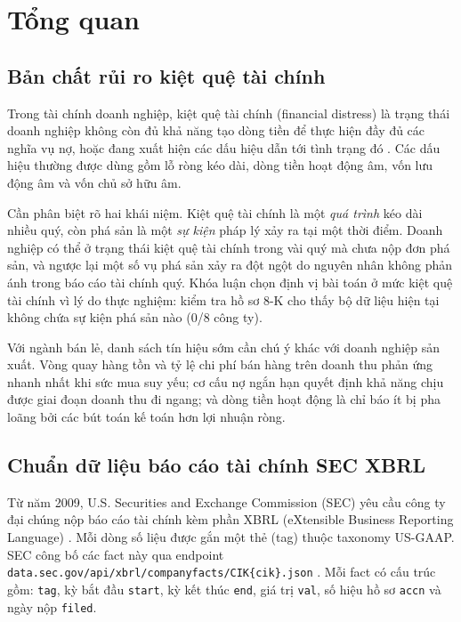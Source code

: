\chapter{Tổng quan}

\section{Bản chất rủi ro kiệt quệ tài chính}

Trong tài chính doanh nghiệp, kiệt quệ tài chính (financial distress) là trạng thái doanh nghiệp
không còn đủ khả năng tạo dòng tiền để thực hiện đầy đủ các nghĩa vụ nợ, hoặc đang xuất hiện các
dấu hiệu dẫn tới tình trạng đó \cite{beaver1966}. Các dấu hiệu thường được dùng gồm lỗ ròng kéo dài,
dòng tiền hoạt động âm, vốn lưu động âm và vốn chủ sở hữu âm.

Cần phân biệt rõ hai khái niệm. Kiệt quệ tài chính là một \emph{quá trình} kéo dài nhiều quý, còn
phá sản là một \emph{sự kiện} pháp lý xảy ra tại một thời điểm. Doanh nghiệp có thể ở trạng thái
kiệt quệ tài chính trong vài quý mà chưa nộp đơn phá sản, và ngược lại một số vụ phá sản xảy ra
đột ngột do nguyên nhân không phản ánh trong báo cáo tài chính quý. Khóa luận chọn định vị bài toán
ở mức kiệt quệ tài chính vì lý do thực nghiệm: kiểm tra hồ sơ 8-K cho thấy bộ dữ liệu hiện tại
không chứa sự kiện phá sản nào (0/8 công ty).

Với ngành bán lẻ, danh sách tín hiệu sớm cần chú ý khác với doanh nghiệp sản xuất. Vòng quay hàng
tồn và tỷ lệ chi phí bán hàng trên doanh thu phản ứng nhanh nhất khi sức mua suy yếu; cơ cấu nợ
ngắn hạn quyết định khả năng chịu được giai đoạn doanh thu đi ngang; và dòng tiền hoạt động là chỉ
báo ít bị pha loãng bởi các bút toán kế toán hơn lợi nhuận ròng.

\section{Chuẩn dữ liệu báo cáo tài chính SEC XBRL}

Từ năm 2009, U.S. Securities and Exchange Commission (SEC) yêu cầu công ty đại chúng nộp báo cáo
tài chính kèm phần XBRL (eXtensible Business Reporting Language) \cite{secxbrl2026}. Mỗi dòng số
liệu được gắn một thẻ (tag) thuộc taxonomy US-GAAP. SEC công bố các fact này qua endpoint
\texttt{data.sec.gov/api/xbrl/companyfacts/CIK\{cik\}.json} \cite{secfacts2026}. Mỗi fact có cấu
trúc gồm: \texttt{tag}, kỳ bắt đầu \texttt{start}, kỳ kết thúc \texttt{end}, giá trị \texttt{val},
số hiệu hồ sơ \texttt{accn} và ngày nộp \texttt{filed}.

